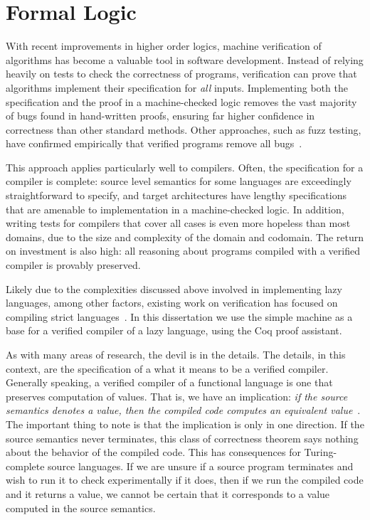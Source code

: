 \section{Formal Logic} \label{sec:background}

With recent improvements in higher order logics, machine verification of
algorithms has become a valuable tool in software development. Instead of
relying heavily on tests to check the correctness of programs, verification can
prove that algorithms implement their specification for \emph{all} inputs.
Implementing both the specification and the proof in a machine-checked logic
removes the vast majority of bugs found in hand-written proofs, ensuring far
higher confidence in correctness than other standard methods. Other approaches,
such as fuzz testing, have confirmed empirically that verified programs remove
all bugs~\cite{yangfuzz}.

This approach applies particularly well to compilers. Often, the specification
for a compiler is complete: source level semantics for some languages are
exceedingly straightforward to specify, and target architectures have lengthy
specifications that are amenable to implementation in a machine-checked logic.
In addition, writing tests for compilers that cover all cases is even more
hopeless than most domains, due to the size and complexity of the domain and
codomain. The return on investment is also high: all reasoning about programs
compiled with a verified compiler is provably preserved. 

Likely due to the complexities discussed above involved in implementing lazy
languages, among other factors, existing work on verification has focused on
compiling strict languages~\cite{chlipala2007certified, leroy2012compcert,
cakeml14}. In this dissertation we use the simple \ce machine as a base for a
verified compiler of a lazy language, using the Coq proof assistant. 

As with many areas of research, the devil is in the details. The details, in
this context, are the specification of a what it means to be a verified
compiler. Generally speaking, a verified compiler of a functional language is
one that preserves computation of values. That is, we have an implication:
\emph{if the source semantics denotes a value, then the compiled code computes
an equivalent value}~\cite{chlipala2007certified}. The important thing to note
is that the implication is only in one direction. If the source semantics never
terminates, this class of correctness theorem says nothing about the behavior of
the compiled code. This has consequences for Turing-complete source languages.
If we are unsure if a source program terminates and wish to run it to check
experimentally if it does, then if we run the compiled code and it returns a
value, we cannot be certain that it corresponds to a value computed in the
source semantics. 

